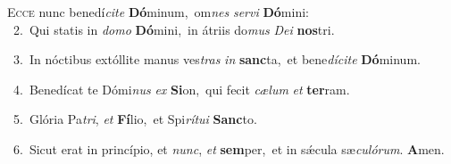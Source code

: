 \lettrine{\initial\textcolor{\initialcolor}{E}}{cce} nunc benedí\-\textit{ci}\-\textit{te} \textbf{Dó}\-minum,~\star om\textit{nes} \textit{ser}\-\textit{vi} \textbf{Dó}\-mini:\\
{\numbfont\textcolor{\numbcolor}{~2.}}~Qui statis in \textit{do}\-\textit{mo} \textbf{Dó}\-mini,~\star in átriis do\textit{mus} \textit{De}\-\textit{i} \textbf{nos}\-tri.\par
{\numbfont\textcolor{\numbcolor}{~3.}}~In nóctibus extóllite manus ves\textit{tras} \textit{in} \textbf{sanc}\-ta,~\star et bene\-\textit{dí}\-\textit{ci}\textit{te} \textbf{Dó}\-minum.\par
{\numbfont\textcolor{\numbcolor}{~4.}}~Benedícat te Dómi\textit{nus} \textit{ex} \textbf{Si}\-on,~\star qui fecit \textit{cæ}\-\textit{lum} \textit{et} \textbf{ter}\-ram.\par
{\numbfont\textcolor{\numbcolor}{~5.}}~Glória Pa\-\textit{tri}\-, \textit{et} \textbf{Fí}\-lio,~\star et Spi\-\textit{rí}\-\textit{tu}\textit{i} \textbf{Sanc}\-to.\par
{\numbfont\textcolor{\numbcolor}{~6.}}~Sicut erat in princípio, et \textit{nunc}\-, \textit{et} \textbf{sem}\-per,~\star et in sǽcula sæ\-\textit{cu}\-\textit{ló}\textit{rum}. \textbf{A}\-men.\par
